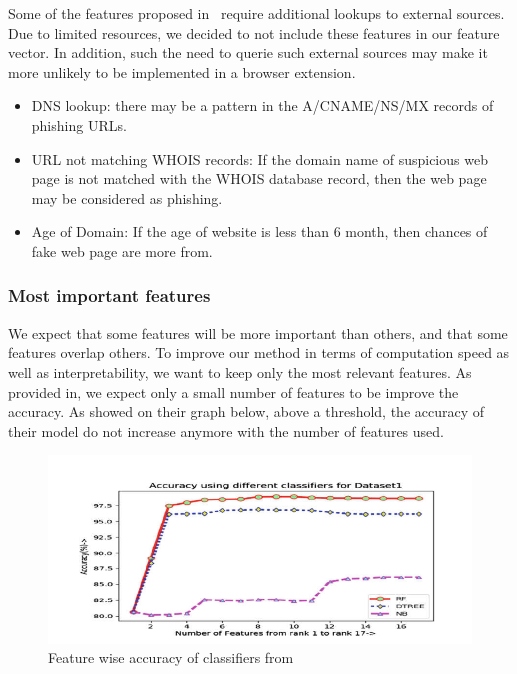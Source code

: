 \documentclass{article}
\begin{document}
    Some of the features proposed in~\cite{PhishSafe} require additional lookups to external sources.
    Due to limited resources, we decided to not include these features in our feature vector.
    In addition, such the need to querie such external sources may make it more unlikely to be implemented in a browser extension.
    \begin{itemize}
        \item DNS lookup: there may be a pattern in the A/CNAME/NS/MX records of phishing URLs.
        \item URL not matching WHOIS records: If the domain name of suspicious web page is not matched with the WHOIS database record, then the web page may be considered as phishing.
        \item Age of Domain: If the age of website is less than 6 month, then chances of fake web page are more from.
    \end{itemize}

    \subsubsection{Most important features}

    We expect that some features will be more important than others, and that some features overlap others.
    To improve our method in terms of computation speed as well as interpretability, we want to keep only the most relevant features.
    As provided in\cite{LexicalFeatureSelection}, we expect only a small number of features to be improve the accuracy.
    As showed on their graph below, above a threshold, the accuracy of their model do not increase anymore with the number of features used.

    \begin{figure}[H]
        \centering
        \includegraphics[width=\textwidth]{report_img/lexicalfeatureselectionaccuracygraph}
        \caption{Feature wise accuracy of classifiers from\cite{LexicalFeatureSelection}}
        \label{fig:kEvolution}
    \end{figure}
\end{document}
